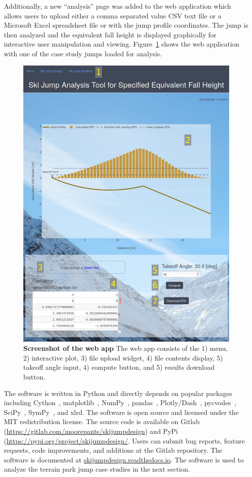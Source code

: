 \documentclass{article}
\begin{document}
Additionally, a new
``analysis'' page was added to the web application which allows users to upload
either a comma separated value CSV text file or a Microsoft Excel spreadsheet
file or with the jump profile coordinates. The jump is then analyzed and the
equivalent fall height is displayed graphically for interactive user
manipulation and viewing. Figure~\ref{fig:web-app-screenshot} shows the web
application with one of the case study jumps loaded for analysis.
%
\begin{figure}
  \centering
  \includegraphics[width=5.00in]{figures/web-app-screenshot.png}
  \caption{\textbf{Screenshot of the web app} The web app consists of the 1)
    menu, 2) interactive plot, 3) file upload widget, 4) file contents display,
    5) takeoff angle input, 4) compute button, and 5) results download button.}
  \label{fig:web-app-screenshot}
\end{figure}

The software is written in Python and directly depends on popular packages
including Cython~\cite{Behnel2011}, matplotlib~\cite{Hunter2007},
NumPy~\cite{Oliphant2006}, pandas~\cite{McKinney2020},
Plotly/Dash~\cite{Plotly2015}, pycvodes~\cite{Dahlgren2018},
SciPy~\cite{Virtanen2020}, SymPy~\cite{Meurer2017}, and xlrd.
The software is open source and licensed under the MIT redistribution license.
The source code is available on Gitlab
(\url{https://gitlab.com/moorepants/skijumpdesign}) and PyPi
(\url{https://pypi.org/project/skijumpdesign/}. Users can submit bug reports, feature
requests, code improvements, and additions at the Gitlab repository. The
software is documented at
\href{https://skijumpdesign.readthedocs.io}{skijumpdesign.readthedocs.io}. The
software is used to analyze the terrain park jump case studies in the next
section.
\end{document}

